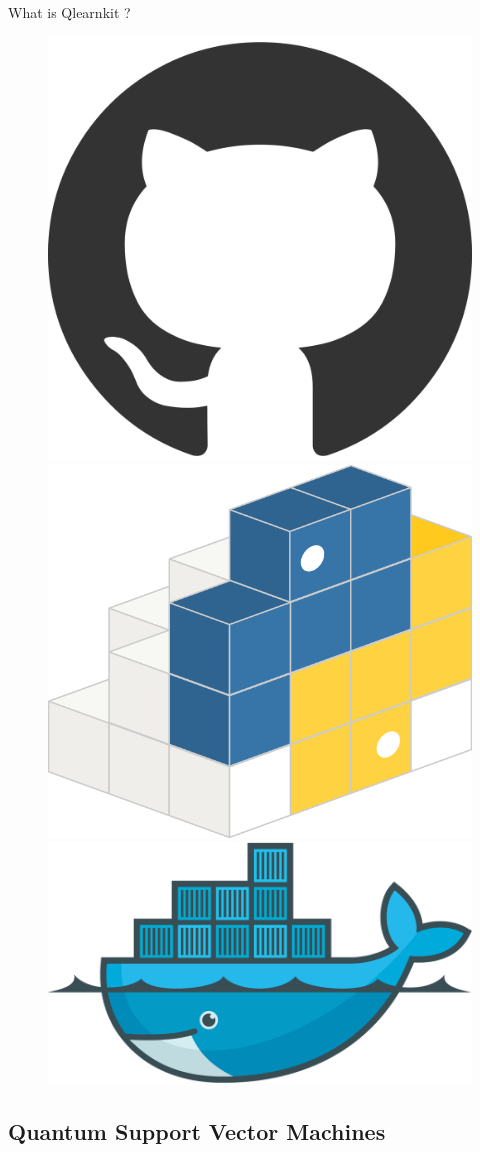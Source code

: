 \begin{frame}{What is Qlearnkit ?}
\begin{itemize}
        \begin{figure}
            \centering
            \begin{minipage}[c]{0.3\textwidth}
    			\includegraphics[width=0.4\linewidth]{gh_logo}
    		\end{minipage}
    		\begin{minipage}[c]{0.3\textwidth}
    			\includegraphics[width=0.4\linewidth]{pypilogo}
    		\end{minipage}
            \begin{minipage}[c]{0.3\textwidth}
			    \includegraphics[width=0.6\linewidth]{docker-logo}
    		\end{minipage}
        \end{figure}
		
    \end{itemize}
\end{frame}


\subsection{Quantum Support Vector Machines}


